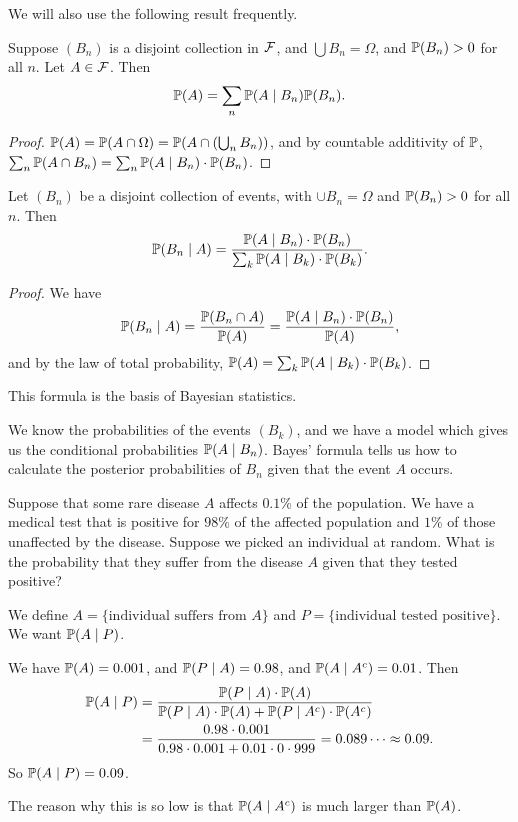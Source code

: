 \documentclass[a4paper]{scrreprt}
\begin{document}
We will also use the following result frequently.

\begin{proposition}
	Suppose $(B_n)$ is a disjoint collection in $\mathcal{F}$, and $\bigcup B_n = \Omega$, and $\mathbb{P}(B_n) > 0$ for all $n$. Let $A \in \mathcal{F}$. Then 
	$$
	\mathbb{P}(A) = \sum_n \mathbb{P}(A \mid B_n) \mathbb{P}(B_n).
	$$
\end{proposition}
\begin{proof}
	$\mathbb{P}(A) = \mathbb{P}(A \cap \Omega) = \mathbb{P}(A \cap (\bigcup_n B_n))$, and by countable additivity of $\mathbb{P}$, $\sum_{n}\mathbb{P}(A \cap B_n) = \sum_n \mathbb{P}(A\mid B_n) \cdot \mathbb{P}(B_n)$.
\end{proof}

\begin{proposition}
	Let $(B_n)$ be a disjoint collection of events, with $\cup B_n = \Omega$ and $\mathbb{P}(B_n) > 0$ for all $n$. Then
	$$
	\mathbb{P}(B_n \mid A) = \frac{\mathbb{P}(A \mid B_n) \cdot \mathbb{P}(B_n)}{\sum_k \mathbb{P}(A\mid B_k) \cdot\mathbb{P}(B_k)}. 
	$$
\end{proposition}
\begin{proof}
	We have
	$$
	\mathbb{P}(B_n \mid A) = \frac{\mathbb{P}(B_n \cap A)}{\mathbb{P}(A)} = \frac{\mathbb{P}(A\mid B_n) \cdot \mathbb{P}(B_n)}{\mathbb{P}(A)},
	$$
	and by the law of total probability, $\mathbb{P}(A) = \sum_k \mathbb{P}(A \mid B_k) \cdot \mathbb{P}(B_k)$.
\end{proof}

This formula is the basis of Bayesian statistics.

We know the probabilities of the events $(B_k)$, and we have a model which gives us the conditional probabilities $\mathbb{P}(A \mid B_n)$. Bayes' formula tells us how to calculate the posterior probabilities of $B_n$ given that the event $A$ occurs.

\begin{example}
	Suppose that some rare disease $A$ affects $0.1\%$ of the population. We have a medical test that is positive for $98\%$ of the affected population and $1\%$ of those unaffected by the disease. Suppose we picked an individual at random. What is the probability that they suffer from the disease $A$ given that they tested positive?

	We define $A = \{\text{individual suffers from $A$}\}$ and $P =\{\text{individual tested positive}\}$. We want $\mathbb{P}(A \mid P)$.

	We have $\mathbb{P}(A) = 0.001$, and $\mathbb{P}(P \mid A) = 0.98$, and $\mathbb{P}(A \mid A^c) = 0.01$. Then
	\begin{align*}
		\mathbb{P}(A \mid P) &= \frac{\mathbb{P}(P \mid A) \cdot \mathbb{P}(A)}{\mathbb{P}(P \mid A) \cdot \mathbb{P}(A) + \mathbb{P}(P \mid A^c) \cdot \mathbb{P}(A^c)} \\
		&= \frac{0.98 \cdot 0.001}{0.98 \cdot 0.001 + 0.01\cdot 0\cdot 999} = 0.089\dots \approx 0.09.
	\end{align*}
	So $\mathbb{P}(A \mid P) = 0.09$. 

	The reason why this is so low is that $\mathbb{P}(A \mid A^c)$ is much larger than $\mathbb{P}(A)$.
\end{example}
\end{document}
